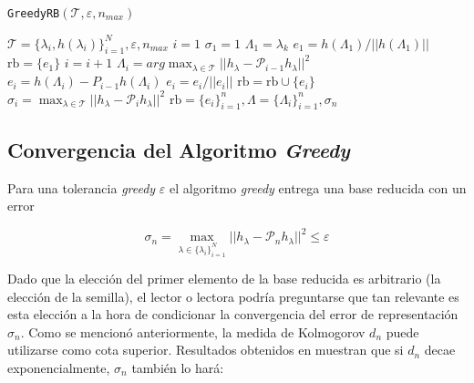 \begin{algorithm}
\caption{\texttt{GreedyRB}\((\mathcal{T}, \varepsilon, n_{max})\)}\label{alg:rb}
\begin{algorithmic}[1]
\Require $\mathcal{T} = \{ \lambda_{i}, h(\lambda_i) \}_{i=1}^N, \varepsilon, n_{max}$ 
\vspace{3mm}
\State $i = 1$
\State $\sigma_1 = 1$ 
\State $\Lambda_1 = \lambda_k$	
\State $e_1 = h(\Lambda_1)/||h(\Lambda_1)||$	
\State $\text{rb}=\{e_1\}$	
\vspace{2mm}
	\State $i = i+1$
	\State $\Lambda_i = 	arg \max_{\lambda \in \mathcal{T}}||h_{\lambda}-\mathcal{P}_{i-1}h_{\lambda}||^2$ 
	\State $e_i = h(\Lambda_i) - {P}_{i-1}h(\Lambda_i)$ 
	\State $e_i = e_i / ||e_i|| $ 	
	\State $\text{rb} = \text{rb} \cup \{e_i\}$
	\State $\sigma_i = \max_{\lambda \in \mathcal{T}}||h_{\lambda}-\mathcal{P}_{i}h_{\lambda}||^2$	
\EndWhile
\vspace{3mm}
\Ensure $\text{rb} = \{ e_i\}_{i=1}^{n},\Lambda = \{\Lambda_i\}_{i=1}^{n}, \sigma_n$
\end{algorithmic}
\end{algorithm}


\subsection{Convergencia del Algoritmo \textit{Greedy}}

Para una tolerancia \textit{greedy} $\varepsilon$ el algoritmo \textit{greedy} entrega una base reducida con un error

\[
\sigma_n = \max_{\lambda \in  \{ \lambda_{i}\}_{i=1}^N } || h_{\lambda} - \mathcal{P}_nh_{\lambda} ||^2 \leq \varepsilon
\]

Dado que la elección del primer elemento de la base reducida es arbitrario (la elección de la semilla), el lector o lectora podría preguntarse que tan relevante es esta elección a la hora de condicionar la convergencia del error de representación $\sigma_n$.
Como se mencionó anteriormente, la medida de Kolmogorov $d_n$ puede utilizarse como cota superior. 
Resultados obtenidos en \cite{https://doi.org/10.48550/arxiv.1204.2290} muestran que si $d_n$ decae exponencialmente, $\sigma_n$ también lo hará:

